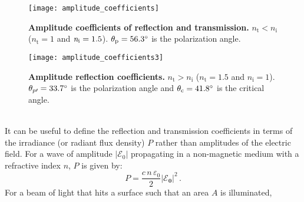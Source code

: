 \begin{figure}[t]
  \begin{minipage}[h]{0.48\textwidth}
    \texttt{[image: amplitude\_coefficients]}
    \caption{\textbf{Amplitude coefficients of reflection and transmission.} $n_\textrm{t}<n_\textrm{i}$
($n_\textrm{t} = 1$ and $\textit{n}_\textrm{i}=1.5$). $\theta_\textrm{p} = 56.3^\circ$ is the polarization angle.}
    \label{fig:coefficients}
  \end{minipage}\hfill
  \begin{minipage}[h]{0.48\textwidth}
    \texttt{[image: amplitude\_coefficients3]}
    \caption{\textbf{Amplitude reflection coefficients.} $n_\textrm{t}>n_\textrm{i}$
($n_\textrm{t} = 1.5$ and $n_\textrm{i}=1$). $\theta_{p\prime}= 33.7^\circ$ is the polarization angle and $\theta_\textrm{c}= 41.8^\circ$ is the critical angle.}
   \label{fig:coefficients2}
 \end{minipage}
\end{figure}\\
\indent It can be useful to define the reflection and transmission coefficients in terms of the irradiance (or radiant flux density) $P$ rather than amplitudes of the electric field. For a wave of amplitude $|\mathcal{E}_0|$ propagating in a non-magnetic medium with a refractive index $n$, $P$ is given by:
\begin{equation}
P = \frac{c\, n \, \varepsilon_0}{2}|\boldsymbol{\mathcal{E}_0}|^2 \,.
\end{equation}
For a beam of light that hits a surface such that an area $A$ is illuminated,
